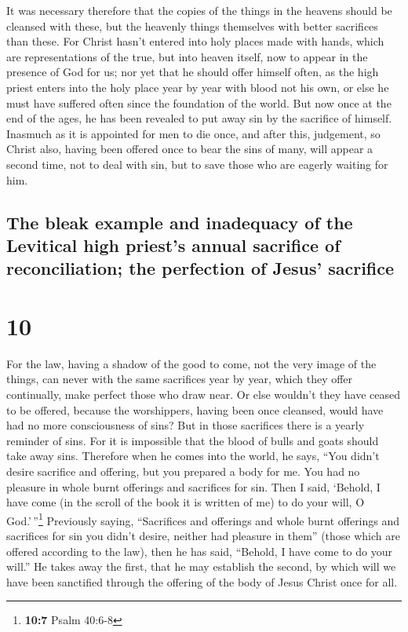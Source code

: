  It was necessary therefore that the copies of the things
in the heavens should be cleansed with these, but the heavenly things
themselves with better sacrifices than these.  For Christ
hasn't entered into holy places made with hands, which are
representations of the true, but into heaven itself, now to appear in
the presence of God for us;  nor yet that he should offer
himself often, as the high priest enters into the holy place year by
year with blood not his own,  or else he must have
suffered often since the foundation of the world. But now once at the
end of the ages, he has been revealed to put away sin by the sacrifice
of himself.  Inasmuch as it is appointed for men to die
once, and after this, judgement,  so Christ also, having
been offered once to bear the sins of many, will appear a second time,
not to deal with sin, but to save those who are eagerly waiting for him.

\hypertarget{the-bleak-example-and-inadequacy-of-the-levitical-high-priests-annual-sacrifice-of-reconciliation-the-perfection-of-jesus-sacrifice}{%
\subsection{The bleak example and inadequacy of the Levitical high
priest's annual sacrifice of reconciliation; the perfection of Jesus'
sacrifice}\label{the-bleak-example-and-inadequacy-of-the-levitical-high-priests-annual-sacrifice-of-reconciliation-the-perfection-of-jesus-sacrifice}}

\hypertarget{section-9}{%
\section{10}\label{section-9}}

 For the law, having a shadow of the good to come, not the
very image of the things, can never with the same sacrifices year by
year, which they offer continually, make perfect those who draw near.
 Or else wouldn't they have ceased to be offered, because
the worshippers, having been once cleansed, would have had no more
consciousness of sins?  But in those sacrifices there is a
yearly reminder of sins.  For it is impossible that the
blood of bulls and goats should take away sins.  Therefore
when he comes into the world, he says, ``You didn't desire sacrifice and
offering, but you prepared a body for me.  You had no
pleasure in whole burnt offerings and sacrifices for sin. 
Then I said, `Behold, I have come (in the scroll of the book it is
written of me) to do your will, O God.'\,''\footnote{\textbf{10:7} Psalm
  40:6-8}  Previously saying, ``Sacrifices and offerings
and whole burnt offerings and sacrifices for sin you didn't desire,
neither had pleasure in them'' (those which are offered according to the
law),  then he has said, ``Behold, I have come to do your
will.'' He takes away the first, that he may establish the second,
 by which will we have been sanctified through the
offering of the body of Jesus Christ once for all.


